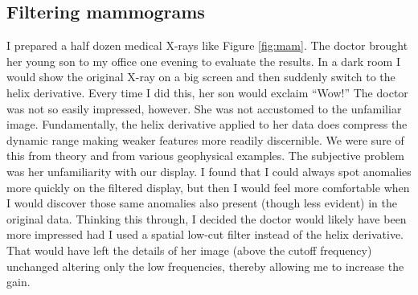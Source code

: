 \subsection{Filtering mammograms}

\par
I prepared a half dozen medical X-rays like Figure 
\ref{fig:mam}.
The doctor brought her young son to my office one evening
to evaluate the results.
In a dark room I would show the original X-ray on a big screen
and then suddenly switch to the helix derivative.
Every time I did this, her son would exclaim ``Wow!''
The doctor was not so easily impressed, however.
She was not accustomed to the unfamiliar image.
Fundamentally, the helix derivative applied to her data
does compress the dynamic range making weaker features more readily discernible.
We were sure of this from theory and from
various geophysical examples.
The subjective problem was her unfamiliarity with our display.
I found that I could always spot anomalies more quickly
on the filtered display, but then I would feel more comfortable
when I would discover those same anomalies also present
(though less evident) in the original data.
Thinking this through, I decided the doctor would likely have
been more impressed
had I used a spatial low-cut filter instead of the helix derivative.
That would have left the details of her image
(above the cutoff frequency)
unchanged
altering
only the low frequencies,
thereby allowing me to increase the gain.

